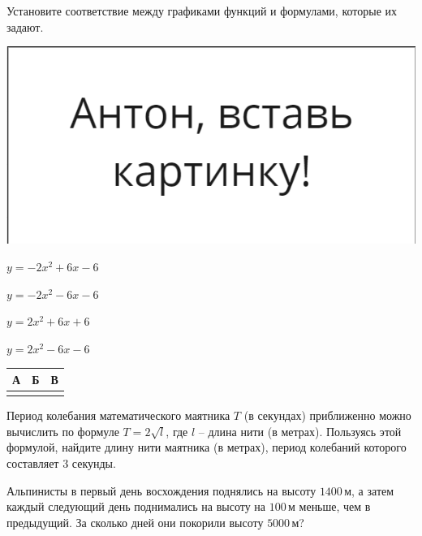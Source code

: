 \begin{class}[number=3]
\begin{listofex}
		\item 
		\begin{minipage}[t]{0.57\textwidth}
			Установите соответствие между графиками функций и формулами, которые их задают.
		\end{minipage}
		\begin{minipage}[c]{0.3\textwidth}
			\includegraphics[align=t, width=\textwidth]{pics/G91M4L4-1}
		\end{minipage}
		\begin{enumcols}[itemcolumns=1]
			\item \( y=-2x^2+6x-6 \)
			\item \( y=-2x^2-6x-6 \)
			\item \( y=2x^2+6x+6 \)
			\item \( y=2x^2-6x-6 \)
		\end{enumcols}
		\begin{center}
			\footnotesize
			\begin{tabular}{|c|c|c|}
				\hline
				А&Б&В\\
				\hline
			 & & \\
				\hline
			\end{tabular}
		\end{center}
	
		\item Период колебания математического маятника \( T \) (в секундах) приближенно можно вычислить по формуле \( T=2\sqrt{l} \), где \( l \) -- длина нити (в метрах). Пользуясь этой формулой, найдите длину нити маятника (в метрах), период колебаний которого составляет \( 3 \) секунды.
		
		\item Альпинисты в первый день восхождения поднялись на высоту \( 1400 \) м, а затем каждый следующий день поднимались на высоту на \( 100 \) м меньше, чем в предыдущий. За сколько дней они покорили высоту \( 5000 \) м?
		

\end{listofex}
\end{class}
